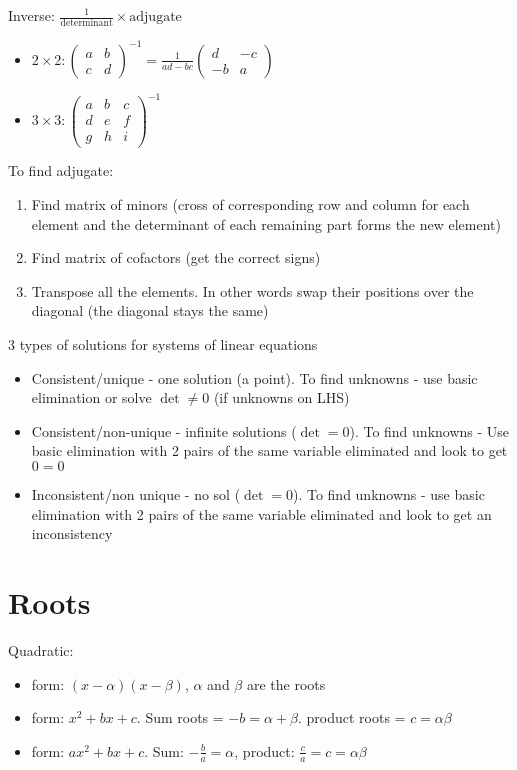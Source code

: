 \documentclass[10pt,a4paper,oneside]{book}
\begin{document}
Inverse: $\frac{1}{\text{determinant}}\times \text{adjugate}$
\begin{itemize}
    \item $2\times 2: \begin{pmatrix}
        a & b \\
        c & d 
    \end{pmatrix}^{-1}= \frac{1}{ad-bc}\begin{pmatrix}
        d & -c \\ 
        -b & a 
    \end{pmatrix}$

    \item $3\times 3: \begin{pmatrix}
        a & b & c \\ 
        d & e & f \\ 
        g & h & i
    \end{pmatrix}^{-1}$
\end{itemize}
To find adjugate:
\begin{enumerate}
    \item Find matrix of minors (cross of corresponding row and column for each element and the determinant of each remaining part forms the new element)
    \item Find matrix of cofactors (get the correct signs)
    \item Transpose all the elements. In other words swap their positions over the diagonal (the diagonal stays the same)
\end{enumerate}

3 types of solutions for systems of linear equations 
\begin{itemize}
    \item Consistent/unique - one solution (a point). To find unknowns - use basic elimination or solve $\det \neq 0$ (if unknowns on LHS)
    \item Consistent/non-unique - infinite solutions ($\det = 0$). To find unknowns - Use basic elimination with 2 pairs of the same variable eliminated and look to get $0=0$
    \item Inconsistent/non unique - no sol ($\det = 0$). To find unknowns - use basic elimination with 2 pairs of the same variable eliminated and look to get an inconsistency
\end{itemize}

\section*{Roots}
Quadratic:
\begin{itemize}
    \item form: $(x-\alpha)(x-\beta)$, $\alpha$ and $\beta$ are the roots 
    \item form: $x^2+bx+c$. Sum roots = $-b=\alpha + \beta$. product roots = $c=\alpha\beta$
    \item form: $ax^2+bx+c$. Sum: $-\frac{b}{a}=\alpha$, product: $\frac{c}{a}=c=\alpha\beta$
\end{itemize}
\end{document}
